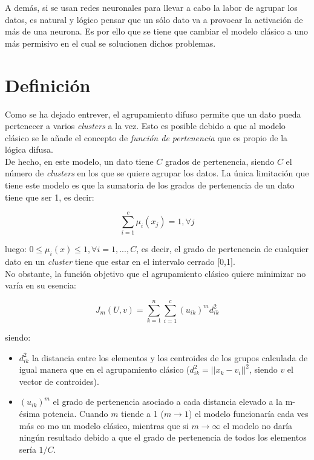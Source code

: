 \documentclass[]{report}
\begin{document}
		A demás, si se usan redes neuronales para llevar a cabo la labor de agrupar los datos, es natural y lógico pensar que un sólo dato va a provocar la activación de más de una neurona. Es por ello que se tiene que cambiar el modelo clásico a uno más permisivo en el cual se solucionen dichos problemas.
			
		\section{Definición}
			Como se ha dejado entrever, el agrupamiento difuso permite que un dato pueda pertenecer a varios \textit{clusters} a la vez. Esto es posible debido a que al modelo clásico se le añade el concepto de \textit{función de pertenencia} que es propio de la lógica difusa.\\
			
			De hecho, en este modelo, un dato tiene $C$ grados de pertenencia, siendo $C$ el número de \textit{clusters} en los que se quiere agrupar los datos. La única limitación que tiene este modelo es que la sumatoria de los grados de pertenencia de un dato tiene que ser 1, es decir:
			
			$$\sum_{i=1}^c\mu_i(x_j) = 1, \forall j$$
			
			luego: $0 \leq \mu_i(x) \leq 1, \forall i=1,...,C$, es decir, el grado de pertenencia de cualquier dato en un \textit{cluster} tiene que estar en el intervalo cerrado [0,1].\\
			
			No obstante, la función objetivo que el agrupamiento clásico quiere minimizar no varía en su esencia:
			
			$$J_m(U,v) = \sum_{k=1}^n \sum_{i=1}^c (u_{ik})^m d^2_{ik}$$

			siendo:
			\begin{itemize}
				\item $d^2_{ik}$ la distancia entre los elementos y los centroides de los grupos calculada de igual manera que en el agrupamiento clásico ($d^2_{ik} = ||x_k-v_i||^2$, siendo $v$ el vector de controides).
				\item $(u_{ik})^m$ el grado de pertenencia asociado a cada distancia elevado a la m-ésima potencia. Cuando $m$ tiende a 1 ($m \rightarrow 1$) el modelo funcionaría cada ves más co mo un modelo clásico, mientras que si $m \rightarrow \infty$ el modelo no daría ningún resultado debido a que el grado de pertenencia de todos los elementos sería $1/C$.
			\end{itemize}
		
\end{document}
